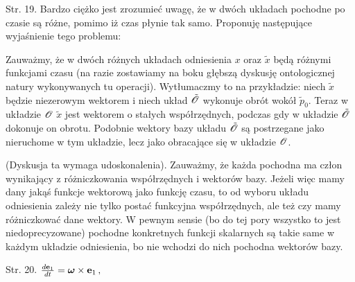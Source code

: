 \documentclass[a4paper,11pt]{article}
\begin{document}










\newpage


\vspace{0em}



\vspace{0em}



\vspace{\spaceFour}



\noindent
Str. 19. Bardzo ciężko jest zrozumieć uwagę, że w dwóch układach pochodne po czasie są różne, pomimo iż czas płynie tak samo. Proponuję następujące wyjaśnienie tego problemu:

Zauważmy, że w dwóch różnych układach odniesienia $x$ oraz
$\tilde{ x }$ będą różnymi funkcjami czasu (na razie zostawiamy na
boku głębszą dyskusję ontologicznej natury wykonywanych tu operacji).
Wytłumaczmy to na przykładzie: niech $\tilde{ x }$ będzie niezerowym
wektorem i niech układ $\tilde{ \mathcal{O} }$ wykonuje obrót wokół
$\tilde{ p }_{ 0 }$. Teraz w układzie $\mathcal{O}$ $\tilde{ x }$
jest wektorem o stałych współrzędnych, podczas gdy w układzie
$\tilde{ \mathcal{O} }$ dokonuje on obrotu. Podobnie wektory bazy
układu $\tilde{ \mathcal{O} }$ są postrzegane jako nieruchome w tym
układzie, lecz jako obracające się w
układzie $\mathcal{O}$.

(Dyskusja ta wymaga udoskonalenia). Zauważmy, że każda pochodna ma
człon wynikający z różniczkowania współrzędnych i wektorów bazy.
Jeżeli więc mamy dany jakąś funkcje wektorową jako funkcję czasu, to
od wyboru układu odniesienia zależy nie tylko postać funkcyjna
współrzędnych, ale też czy mamy różniczkować dane wektory. W pewnym
sensie (bo do tej pory wszystko to jest niedoprecyzowane) pochodne
konkretnych funkcji skalarnych są takie same w każdym układzie
odniesienia, bo nie wchodzi do nich pochodna wektorów bazy.



Str. 20.
$\frac{ d\mathbf{e}_{ 1 } }{ dt } = \boldsymbol{\omega} \times \mathbf{e}_{ 1 } \, ,$
\end{document}
